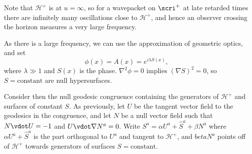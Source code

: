 \documentclass{jknotes}
\begin{document}
Note that \(\mathcal{H}^+\) is at \(u=\infty\), so for a wavepacket on \(\scri^+\) at late retarded times there are infinitely many oscillations close to \(\mathcal{H}^+\), and hence an observer crossing the horizon measures a very large frequency.
\begin{figure}[H]
    \centering
\end{figure}

As there is a large frequency, we can use the approximation of geometric optics, and set 
\begin{equation}
    \phi(x)=A(x) = e^{i\lambda S(x)},
\end{equation}
where \(\lambda\gg1\) and \(S(x)\) is the phase. \(\nabla^2\phi=0\) implies \((\nabla S)^2=0\), so \(S=\text{constant}\) are null hypersurfaces.

Consider then the null geodesic congruence containing the generators of \(\mathcal{H}^+\) and surfaces of constant \(S\). As previously, let \(U\) be the tangent vector field to the geodesics in the congruence, and let \(N\) be a null vector field such that \(N\vdot U=-1\) and \(U\vdot\nabla N^a=0\). Write \(S^a = \alpha U^a + \hat{S}^a + \beta N^a\) where \(\alpha U^a + \hat{S}^a\) is the part orthogonal to \(U^a\) and tangent to \(\mathcal{H}^+\), and \(beta N^a\) points off of \(\mathcal{H}^+\) towards generators of surfaces \(S=\text{constant}\).
\end{document}

